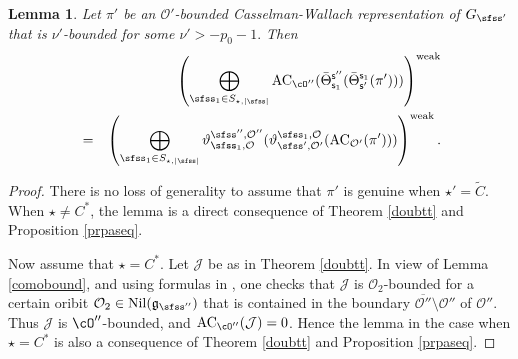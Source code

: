 \documentclass[12pt,a4paper]{amsart}
\def\abs#1{\left|{#1}\right|}
\newcommand{\CJ}{{\mathcal {J}}}
\newcommand{\CO}{{\mathcal {O}}}
\newcommand{\g}{\mathfrak g}
\numberwithin{equation}{section}
\newtheorem{lem}[thm]{Lemma}
\theoremstyle{remark}
\def\Thetab{\bar{\Theta}}
\begin{document}
\begin{lem}\label{lem:GDS.AC2}
  Let $\pi'$ be an $\CO'$-bounded Casselman-Wallach representation of $G_{\sfss'}$  that is  $\nu'$-bounded for some
$
  \nu'>
 -p_0-1.
$
Then
 \begin{eqnarray*}
  && \left( \bigoplus_{\sfss_1\in S_{\star, \abs{\sfss}} } \mathrm{AC}_{\cO''}( \Thetab^{\mathsf s''}_{\mathsf s_1}(\Thetab_{\mathsf s'}^{\mathsf s_1}(\pi')))\right)^{\mathrm{weak}}
\\
&=& \left( \bigoplus_{\sfss_1\in S_{\star, \abs{\sfss}}}   \vartheta^{\sfss'', \CO''}_{\sfss_1, \CO}(\vartheta^{\sfss_1, \CO}_{\sfss',\CO'}(\mathrm{AC}_{\CO'}(\pi')))\right)^{\mathrm{weak}}.
\end{eqnarray*}

\end{lem}
\begin{proof}
There is no loss of generality to assume that $\pi'$ is genuine when $\star'=\widetilde C$. When $\star\neq C^*$, the lemma is a direct consequence of Theorem \ref{doubtt} and Proposition \ref{prpaseq}.

Now assume that $\star=C^*$.  Let $\CJ$ be as in Theorem \ref{doubtt}. In view of Lemma \ref{comobound}, and using formulas in  \cite[Theorems 5.2 and 5.6]{DKPC}, one checks that $\CJ$ is $\CO_2$-bounded for a certain oribit $\CO_2\in \mathrm{Nil}(\g_{\sfss''})$ that is contained in the boundary $\overline{\CO''}\setminus \CO''$ of  $\CO''$. Thus
$\CJ$ is $\cO''$-bounded, and $ \mathrm{AC}_{\cO''}(\CJ)=0$. Hence  the  lemma in the case when $\star=C^*$  is also a consequence of Theorem \ref{doubtt} and Proposition \ref{prpaseq}.

\end{proof}
\end{document}

